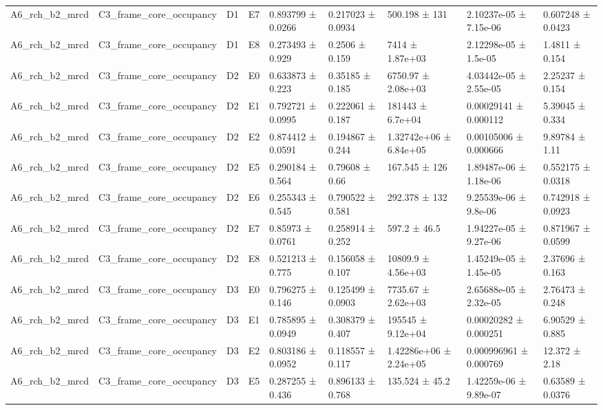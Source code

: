 \begin{table}
\begin{tabular}{lllllllll}
A6\_rch\_b2\_mrcd & C3\_frame\_core\_occupancy & D1 & E7 & 0.893799 ± 0.0266 & 0.217023 ± 0.0934 & 500.198 ± 131 & 2.10237e-05 ± 7.15e-06 & 0.607248 ± 0.0423 \\
A6\_rch\_b2\_mrcd & C3\_frame\_core\_occupancy & D1 & E8 & 0.273493 ± 0.929 & 0.2506 ± 0.159 & 7414 ± 1.87e+03 & 2.12298e-05 ± 1.5e-05 & 1.4811 ± 0.154 \\
A6\_rch\_b2\_mrcd & C3\_frame\_core\_occupancy & D2 & E0 & 0.633873 ± 0.223 & 0.35185 ± 0.185 & 6750.97 ± 2.08e+03 & 4.03442e-05 ± 2.55e-05 & 2.25237 ± 0.154 \\
A6\_rch\_b2\_mrcd & C3\_frame\_core\_occupancy & D2 & E1 & 0.792721 ± 0.0995 & 0.222061 ± 0.187 & 181443 ± 6.7e+04 & 0.00029141 ± 0.000112 & 5.39045 ± 0.334 \\
A6\_rch\_b2\_mrcd & C3\_frame\_core\_occupancy & D2 & E2 & 0.874412 ± 0.0591 & 0.194867 ± 0.244 & 1.32742e+06 ± 6.84e+05 & 0.00105006 ± 0.000666 & 9.89784 ± 1.11 \\
A6\_rch\_b2\_mrcd & C3\_frame\_core\_occupancy & D2 & E5 & 0.290184 ± 0.564 & 0.79608 ± 0.66 & 167.545 ± 126 & 1.89487e-06 ± 1.18e-06 & 0.552175 ± 0.0318 \\
A6\_rch\_b2\_mrcd & C3\_frame\_core\_occupancy & D2 & E6 & 0.255343 ± 0.545 & 0.790522 ± 0.581 & 292.378 ± 132 & 9.25539e-06 ± 9.8e-06 & 0.742918 ± 0.0923 \\
A6\_rch\_b2\_mrcd & C3\_frame\_core\_occupancy & D2 & E7 & 0.85973 ± 0.0761 & 0.258914 ± 0.252 & 597.2 ± 46.5 & 1.94227e-05 ± 9.27e-06 & 0.871967 ± 0.0599 \\
A6\_rch\_b2\_mrcd & C3\_frame\_core\_occupancy & D2 & E8 & 0.521213 ± 0.775 & 0.156058 ± 0.107 & 10809.9 ± 4.56e+03 & 1.45249e-05 ± 1.45e-05 & 2.37696 ± 0.163 \\
A6\_rch\_b2\_mrcd & C3\_frame\_core\_occupancy & D3 & E0 & 0.796275 ± 0.146 & 0.125499 ± 0.0903 & 7735.67 ± 2.62e+03 & 2.65688e-05 ± 2.32e-05 & 2.76473 ± 0.248 \\
A6\_rch\_b2\_mrcd & C3\_frame\_core\_occupancy & D3 & E1 & 0.785895 ± 0.0949 & 0.308379 ± 0.407 & 195545 ± 9.12e+04 & 0.00020282 ± 0.000251 & 6.90529 ± 0.885 \\
A6\_rch\_b2\_mrcd & C3\_frame\_core\_occupancy & D3 & E2 & 0.803186 ± 0.0952 & 0.118557 ± 0.117 & 1.42286e+06 ± 2.24e+05 & 0.000996961 ± 0.000769 & 12.372 ± 2.18 \\
A6\_rch\_b2\_mrcd & C3\_frame\_core\_occupancy & D3 & E5 & 0.287255 ± 0.436 & 0.896133 ± 0.768 & 135.524 ± 45.2 & 1.42259e-06 ± 9.89e-07 & 0.63589 ± 0.0376 \\

\end{tabular}
\end{table}
